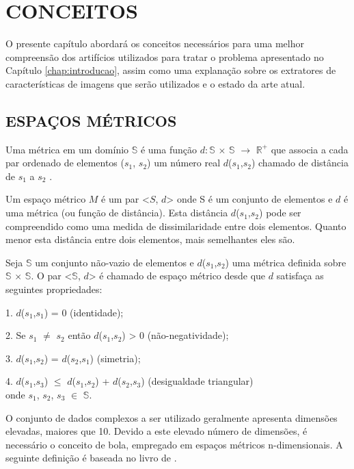 \chapter{CONCEITOS}
\label{chap:conceitos}
O presente capítulo abordará os conceitos necessários para uma melhor compreensão dos artifícios utilizados para tratar o problema apresentado no Capítulo \ref{chap:introducao}, assim como uma
explanação sobre os extratores de características de imagens que serão utilizados e o estado da arte atual.

\section{ESPAÇOS MÉTRICOS}
\label{sec:espmet}
Uma métrica em um domínio $\mathbb{S}$ é uma função $d:\mathbb{S}$ $\times$ $\mathbb{S}$ $\rightarrow$ $\mathbb{R^{+}}$ que associa a cada par 
ordenado de elementos ($s_1$, $s_2$) um número real $d$($s_1$,$s_2$) chamado de distância de $s_1$ a $s_2$ \cite{Lima1977}.\par
Um espaço métrico $M$ é um par <$S$, $d$> onde S é um conjunto de elementos e $d$ é uma métrica
(ou função de distância). Esta distância $d$($s_1$,$s_2$) pode ser compreendido como uma medida de dissimilaridade entre dois elementos.
Quanto menor esta distância entre dois elementos, mais semelhantes eles são.
\begin{mydef}
 \label{def:espmet}
  Seja $\mathbb{S}$ um conjunto não-vazio de elementos e $d$($s_1$,$s_2$) uma métrica definida sobre $\mathbb{S}$ $\times$ $\mathbb{S}$.
   O par <$\mathbb{S}$, $d$> é chamado de espaço métrico desde que $d$ satisfaça as seguintes propriedades:\par
1. $d$($s_1$,$s_1$) = 0 (identidade);\par
2. Se $s_1$ $\neq$ $s_2$ ent\~ao $d$($s_1$,$s_2$) > 0 (n\~ao-negatividade);\par
3. $d$($s_1$,$s_2$) = $d$($s_2$,$s_1$) (simetria);\par
4. $d$($s_1$,$s_3$) $\leq$ $d$($s_1$,$s_2$) + $d$($s_2$,$s_3$) (desigualdade triangular)\\
onde $s_1$, $s_2$, $s_3$ $\in$ $\mathbb{S}$.
\end{mydef}
O conjunto de dados complexos a ser utilizado geralmente apresenta dimensões elevadas, maiores que 10. Devido a este elevado número
de dimensões, é necessário o conceito de bola, empregado em espaços métricos n-dimensionais. A seguinte definição é baseada no livro de \cite{Shirali2005}.

